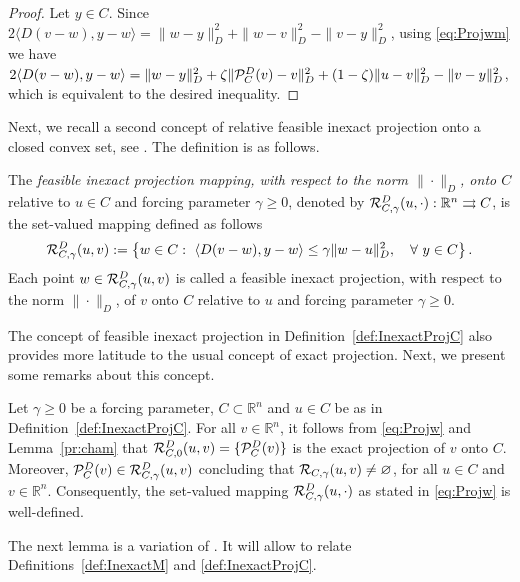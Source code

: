 \begin{proof}
	Let  $y \in C$. Since   $  2\langle D(v-w), y-w\rangle = \|w-y\|_{D}^2 + \|w-v\|_{D}^2-\|v-y\|_{D}^2$,  using \eqref{eq:Projwm}  we have
	$2\langle D(v-w), y-w\rangle = \|w-y\|_{D}^2 + \zeta \| {\cal P}_{C}^{D}(v)-v\|_{D}^2+(1-\zeta)\|u-v\|_{D}^2-\|v-y\|_{D}^2$, which is equivalent to  the desired inequality.
\end{proof}
Next, we recall a second  concept of relative  feasible inexact projection onto a closed convex set, see  \cite{Ademir_Orizon_Leandro2020, OrizonFabianaGilson2018}.  The definition  is as follows.
\begin{definition} \label{def:InexactProjC}
	The {\it feasible inexact projection mapping, with respect to the norm $\| \cdot \|_{D}$,  onto $C$} relative to $u \in C$ and forcing parameter $\gamma\geq 0$, denoted by ${\cal R}_{C,\gamma}^{D}(u, \cdot): {\mathbb R}^n \rightrightarrows C$,  is the set-valued mapping defined as follows
	\begin{equation} \label{eq:Projw}
		{\cal R}_{C,\gamma}^{D}(u, v):= \left\{w\in C:~\left\langle D(v-w), y-w \right\rangle \leq \gamma \|w-u\|_{D}^2, \quad \forall~ y \in C \right\}.
	\end{equation}
	Each point $w\in {\cal R}_{C,\gamma}^{D}(u, v)$ is called a feasible inexact projection,  with respect to the norm $\| \cdot \|_{D}$,  of $v$ onto $C$ relative to $u$ and forcing parameter $\gamma\geq 0$.
\end{definition}
The concept of  feasible inexact projection  in Definition~\ref{def:InexactProjC} also  provides  more latitude to  the usual concept  of exact projection. Next,  we present some remarks about this concept.
\begin{remark}\label{rem: welldef}
	Let $\gamma\geq 0$ be a forcing parameter, $C\subset {\mathbb R}^n$ and $u\in C$ be as in Definition~\ref{def:InexactProjC}.
	For all $v\in {\mathbb R}^n$, it follows from \eqref{eq:Projw} and Lemma~\ref{pr:cham} that ${\cal R}_{C,0}^{D}(u, v)=\{{\cal P}_{C}^{D}(v)\}$ is the exact projection of $v$ onto $C$. Moreover, ${\cal P}_{C}^{D}(v)\in {\cal R}_{C,\gamma}^{D}(u, v)$ concluding  that ${\cal R}_{C, \gamma}(u, v)\neq \varnothing$, for all $u\in C$ and $v\in {\mathbb R}^n$. Consequently, the set-valued mapping ${\cal R}_{C,\gamma}^{D}(u, \cdot)$ as stated in \eqref{eq:Projw} is well-defined.
\end{remark}
The  next lemma is a variation of \cite[Lemma 6]{Reiner_Orizon_Leandro2019}.  It will allow to relate Definitions~\ref{def:InexactM} and \ref{def:InexactProjC}.
